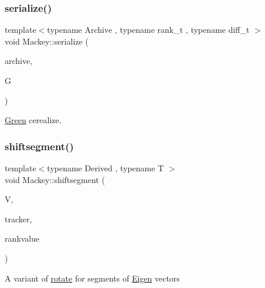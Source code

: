\subsubsection{\texorpdfstring{serialize()}{serialize()}\hspace{0.1cm}{\footnotesize\ttfamily [6/6]}}
{\footnotesize\ttfamily template$<$typename Archive , typename rank\+\_\+t , typename diff\+\_\+t $>$ \\
void Mackey\+::serialize (\begin{DoxyParamCaption}\item[{Archive \&}]{archive,  }\item[{\hyperlink{classMackey_1_1Green}{Green}$<$ rank\+\_\+t, diff\+\_\+t $>$ \&}]{G }\end{DoxyParamCaption})}



\hyperlink{classMackey_1_1Green}{Green} cerealize. 

\mbox{\label{namespaceMackey_aab8a6292210a3b71960cb03b79d218e6}} 
\subsubsection{\texorpdfstring{shiftsegment()}{shiftsegment()}}
{\footnotesize\ttfamily template$<$typename Derived , typename T $>$ \\
void Mackey\+::shiftsegment (\begin{DoxyParamCaption}\item[{Eigen\+::\+Matrix\+Base$<$ Derived $>$ \&}]{V,  }\item[{int}]{tracker,  }\item[{T}]{rankvalue }\end{DoxyParamCaption})}

A variant of \hyperlink{namespaceMackey_a38a833de54971845cbdb8c96f830725b}{rotate} for segments of \hyperlink{namespaceEigen}{Eigen} vectors

